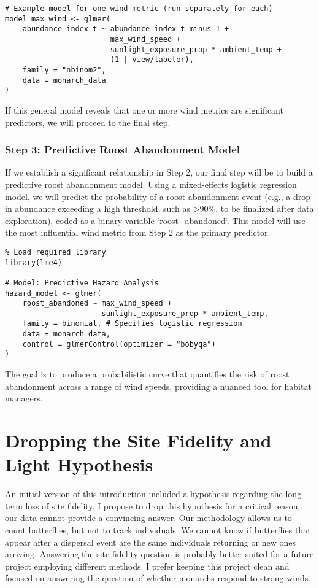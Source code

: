 \begin{verbatim}
# Example model for one wind metric (run separately for each)
model_max_wind <- glmer(
    abundance_index_t ~ abundance_index_t_minus_1 + 
                        max_wind_speed + 
                        sunlight_exposure_prop * ambient_temp +
                        (1 | view/labeler),
    family = "nbinom2",
    data = monarch_data
)
\end{verbatim}

If this general model reveals that one or more wind metrics are significant predictors, we will proceed to the final step.

\subsubsection{Step 3: Predictive Roost Abandonment Model}

If we establish a significant relationship in Step 2, our final step will be to build a predictive roost abandonment model. Using a mixed-effects logistic regression model, we will predict the probability of a roost abandonment event (e.g., a drop in abundance exceeding a high threshold, such as >90\%, to be finalized after data exploration), coded as a binary variable `roost_abandoned`. This model will use the most influential wind metric from Step 2 as the primary predictor.

\begin{verbatim}
% Load required library
library(lme4)

# Model: Predictive Hazard Analysis
hazard_model <- glmer(
    roost_abandoned ~ max_wind_speed + 
                      sunlight_exposure_prop * ambient_temp,
    family = binomial, # Specifies logistic regression
    data = monarch_data,
    control = glmerControl(optimizer = "bobyqa")
)
\end{verbatim}

The goal is to produce a probabilistic curve that quantifies the risk of roost abandonment across a range of wind speeds, providing a nuanced tool for habitat managers.

\section{Dropping the Site Fidelity and Light Hypothesis}

An initial version of this introduction included a hypothesis regarding the long-term loss of site fidelity. I propose to drop this hypothesis for a critical reason: our data cannot provide a convincing answer. Our methodology allows us to count butterflies, but not to track individuals. We cannot know if butterflies that appear after a dispersal event are the same individuals returning or new ones arriving. Answering the site fidelity question is probably better suited for a future project employing different methods. I prefer keeping this project clean and focused on answering the question of whether monarchs respond to strong winds.

